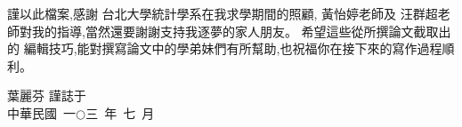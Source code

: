 %
%

謹以此檔案,感謝 台北大學統計學系在我求學期間的照顧, 黃怡婷老師及 汪群超老師對我的指導,當然還要謝謝支持我逐夢的家人朋友。
希望這些從所撰論文截取出的 \cw 編輯技巧,能對撰寫論文中的學弟妹們有所幫助,也祝福你在接下來的寫作過程順利。

\vspace*{10cm}

\begin{flushright}
葉麗芬 謹誌于 \\
中華民國~一$\bigcirc$三~年~七~月
\end{flushright}

%